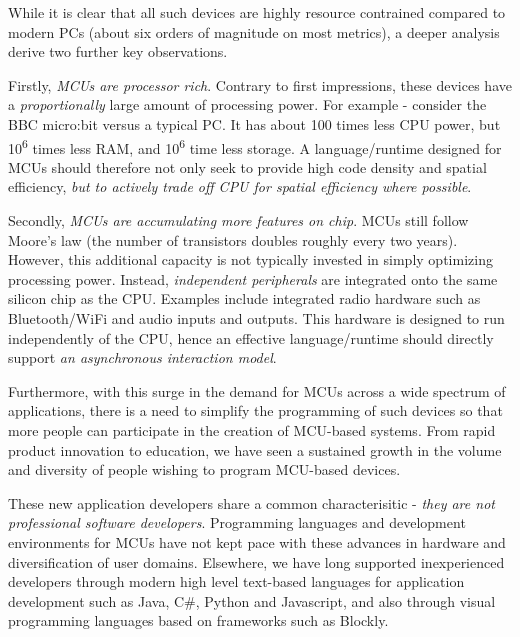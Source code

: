 While it is clear that all such devices are highly resource contrained compared to modern PCs 
(about six orders of magnitude on most metrics), a deeper analysis derive two further key observations.

Firstly, \emph{MCUs are processor rich}. Contrary to first impressions, these devices have 
a \emph{proportionally} large amount of processing power. For example - consider the BBC micro:bit 
versus a typical PC. It has about 100 times less CPU power, but 10\textsuperscript{6} times less RAM, 
and 10\textsuperscript{6} time less storage. A language/runtime designed for MCUs should therefore not 
only seek to provide high code density and spatial efficiency, 
\emph{but to actively trade off CPU for spatial efficiency where possible}. 

Secondly, \emph{MCUs are accumulating more features on chip}. 
MCUs still follow Moore's law (the number of transistors doubles roughly every two years). 
However, this additional capacity is 
not typically invested in simply optimizing processing power. Instead, \emph{independent peripherals} 
are integrated onto the same silicon chip as the CPU. Examples include integrated radio hardware such 
as Bluetooth/WiFi and audio inputs and outputs. This hardware is designed to run independently of the 
CPU, hence an effective language/runtime should directly support \emph{an asynchronous
interaction model}.

Furthermore, with this surge in the demand for MCUs across a wide spectrum of applications, 
there is a need to simplify the programming of such devices so that more people can participate in 
the creation of MCU-based systems. From rapid product innovation to education,
we have seen a sustained growth in the volume and diversity of people wishing to program MCU-based devices.

These new application developers share a common characterisitic - \emph{they are not professional software developers}. 
Programming languages and development environments for MCUs have not kept pace with these advances 
in hardware and diversification of user domains. Elsewhere, we have long supported inexperienced developers through  
modern high level text-based languages for application development such as Java, C\#, Python and Javascript, and also 
through visual programming languages based on frameworks such as Blockly. 

